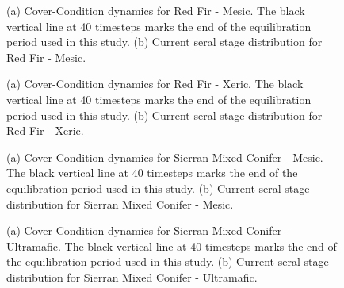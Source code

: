 \begin{figure}[!htbp]
  \centering
  \caption{(a) Cover-Condition dynamics for Red Fir - Mesic. The black vertical line at 40 timesteps marks the end of the equilibration period used in this study. (b) Current seral stage distribution for Red Fir - Mesic.} 
  \label{fig:covcond_rfrm}
\end{figure}

\begin{figure}[!htbp]
  \centering
  \caption{(a) Cover-Condition dynamics for Red Fir - Xeric. The black vertical line at 40 timesteps marks the end of the equilibration period used in this study. (b) Current seral stage distribution for Red Fir - Xeric.} 
  \label{fig:covcond_rfrx}
\end{figure}

\begin{figure}[!htbp]
  \centering
  \caption{(a) Cover-Condition dynamics for Sierran Mixed Conifer - Mesic. The black vertical line at 40 timesteps marks the end of the equilibration period used in this study. (b) Current seral stage distribution for Sierran Mixed Conifer - Mesic.} 
  \label{fig:covcond_smcm}
\end{figure}

\begin{figure}[!htbp]
  \centering
  \caption{(a) Cover-Condition dynamics for Sierran Mixed Conifer - Ultramafic. The black vertical line at 40 timesteps marks the end of the equilibration period used in this study. (b) Current seral stage distribution for Sierran Mixed Conifer - Ultramafic.} 
  \label{fig:covcond_smcu}
\end{figure}

